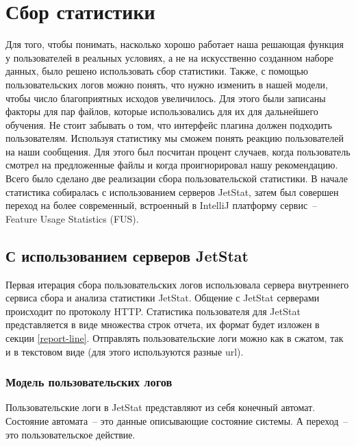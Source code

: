 \documentclass[times]{itmo-student-thesis}
\begin{document}
\section{Сбор статистики}\label{stats-main}
Для того, чтобы понимать, насколько хорошо работает наша решающая функция у пользователей в реальных условиях, а не на искусственно созданном наборе данных, было решено использовать сбор статистики. Также, с помощью пользовательских логов можно понять, что нужно изменить в нашей модели, чтобы число благоприятных исходов увеличилось. Для этого были записаны факторы для пар файлов, которые использовались для их для дальнейшего обучения. Не стоит забывать о том, что интерфейс плагина должен подходить пользователям. Используя статистику мы сможем понять реакцию пользователей на наши сообщения. Для этого был посчитан процент случаев, когда пользователь смотрел на предложенные файлы и когда проигнорировал нашу рекомендацию. Всего было сделано две реализации сбора пользовательской статистики. В начале статистика собиралась с использованием серверов JetStat, затем был совершен переход на более современный, встроенный в IntelliJ платформу сервис~-- Feature Usage Statistics (FUS).
\subsection{С использованием серверов JetStat}
Первая итерация сбора пользовательских логов использовала сервера внутреннего сервиса сбора и анализа статистики JetStat. Общение с JetStat серверами происходит по протоколу HTTP. Статистика пользователя для JetStat представляется в виде множества строк отчета, их формат будет изложен в секции \ref{report-line}. Отправлять пользовательские логи можно как в сжатом, так и в текстовом виде (для этого используются разные url).
\subsubsection{Модель пользовательских логов}
Пользовательские логи в JetStat представляют из себя конечный автомат. Состояние автомата~-- это данные описывающие состояние системы. А переход~-- это пользовательское действие.
\end{document}

